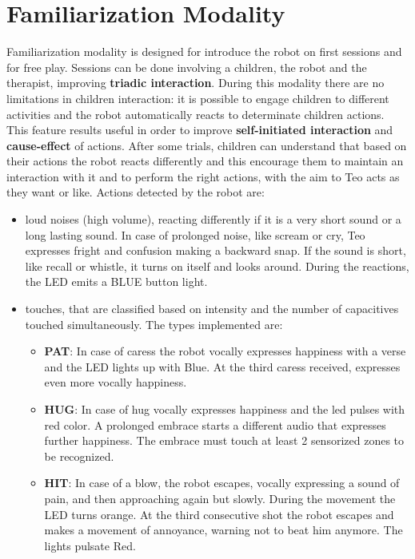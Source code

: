 \section{Familiarization Modality}
\label{FamMod}
Familiarization modality is designed for introduce the robot on first sessions and for free play. Sessions can be done involving a children, the robot and the therapist, improving \textbf{triadic interaction}. During this modality there are no limitations in children interaction: it is possible to engage children to different activities and the robot automatically reacts to determinate children actions. This feature results useful in order to improve \textbf{self-initiated interaction} and \textbf{cause-effect} of actions. After some trials, children can understand that based on their actions the robot reacts differently and this encourage them to maintain an interaction with it and to perform the right actions, with the aim to Teo acts as they want or like. Actions detected by the robot are:
\begin{itemize}
	\item loud noises (high volume), reacting differently if it is a very short sound or a long lasting sound. In case of prolonged noise, like scream or cry, Teo expresses fright and confusion making a backward snap. If the sound is short, like recall or whistle, it turns on itself and looks around. During the reactions, the LED emits a BLUE button light. 
	\item touches, that are classified based on intensity and the number of capacitives touched simultaneously. The types implemented are:
	\begin{itemize}
		\item \textbf{PAT}: In case of caress the robot vocally expresses happiness with a verse and the LED lights up with Blue. At the third caress received, expresses even more vocally happiness.
		\item \textbf{HUG}: In case of hug vocally expresses happiness and the led pulses with red color. A prolonged embrace starts a different audio that expresses further happiness. The embrace must touch at least 2 sensorized zones to be recognized.
		\item \textbf{HIT}: In case of a blow, the robot escapes, vocally expressing a sound of pain, and then approaching again but slowly. During the movement the LED turns orange. At the third consecutive shot the robot escapes and makes a movement of annoyance, warning not to beat him anymore. The lights pulsate Red.
	\end{itemize}
	
\end{itemize} 
